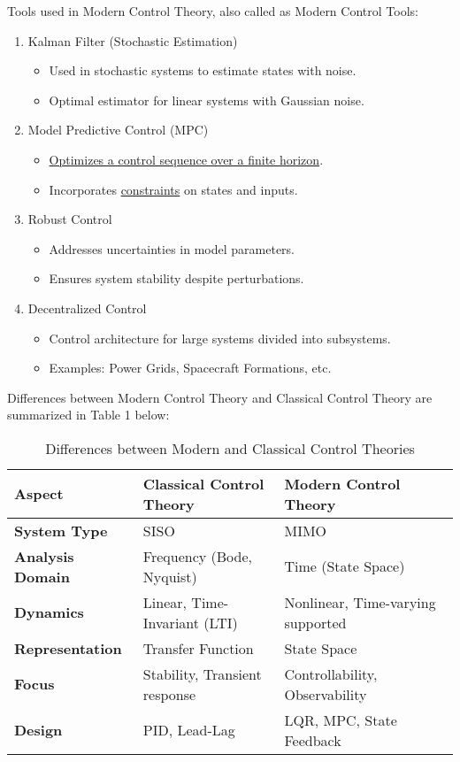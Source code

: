 \documentclass{article}
\begin{document}
Tools used in Modern Control Theory, also called as Modern Control Tools:
\begin{enumerate}
    \item Kalman Filter (Stochastic Estimation)
        \begin{itemize}
            \item Used in stochastic systems to estimate states with noise.
            \item Optimal estimator for linear systems with Gaussian noise.
        \end{itemize}
    \item Model Predictive Control (MPC)
        \begin{itemize}
            \item \underline{Optimizes a control sequence over a finite horizon}.
            \item Incorporates \underline{constraints} on states and inputs.
        \end{itemize}
    \item Robust Control
        \begin{itemize}
            \item Addresses uncertainties in model parameters.
            \item Ensures system stability despite perturbations.
        \end{itemize}
    \item Decentralized Control
        \begin{itemize}
            \item Control architecture for large systems divided into subsystems.
            \item Examples: Power Grids, Spacecraft Formations, etc.
        \end{itemize}
\end{enumerate}

Differences between Modern Control Theory and Classical Control Theory are summarized in Table 1 below:
\renewcommand{\arraystretch}{1.35}
\begin{table}[h]
\centering
\caption{Differences between Modern and Classical Control Theories}
\begin{tabular}{|l|l|l|}
\hline
    \textbf{Aspect} & \textbf{Classical Control Theory} & \textbf{Modern Control Theory} \\ \hline
    \textbf{System Type} & SISO & MIMO \\ \hline
    \textbf{Analysis Domain} & Frequency (Bode, Nyquist) & Time (State Space) \\ \hline
    \textbf{Dynamics} & Linear, Time-Invariant (LTI) & Nonlinear, Time-varying supported \\ \hline
    \textbf{Representation} & Transfer Function & State Space \\ \hline
    \textbf{Focus} & Stability, Transient response & Controllability, Observability \\ \hline
    \textbf{Design} & PID, Lead-Lag & LQR, MPC, State Feedback \\ \hline
\end{tabular}
\end{table}
\end{document}
